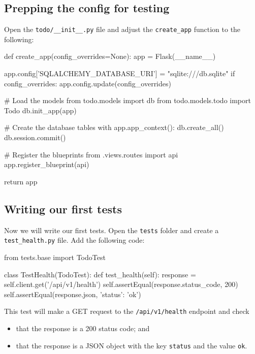 \documentclass{csse4400}
\begin{document}
\subsection{Prepping the config for testing}

Open the \texttt{todo/\_\_init\_\_.py} file and adjust the \texttt{create\_app} function to the following:

\begin{code}[language=python,numbers=none]{}
  def create_app(config_overrides=None):
      app = Flask(__name__)
  
      app.config['SQLALCHEMY_DATABASE_URI'] = "sqlite:///db.sqlite"
      if config_overrides:
          app.config.update(config_overrides)
          
      # Load the models
      from todo.models import db
      from todo.models.todo import Todo
      db.init_app(app)
  
      # Create the database tables
      with app.app_context():
          db.create_all()
          db.session.commit()
  
      # Register the blueprints
      from .views.routes import api
      app.register_blueprint(api)
  
      return app
\end{code}

\subsection{Writing our first tests}

Now we will write our first tests.
Open the \texttt{tests} folder and create a \texttt{test\_health.py} file.
Add the following code:

\begin{code}[language=python,numbers=none]{}
  from tests.base import TodoTest
  
  
  class TestHealth(TodoTest):
      def test_health(self):
          response = self.client.get('/api/v1/health')
          self.assertEqual(response.status_code, 200)
          self.assertEqual(response.json, {'status': 'ok'})

\end{code}

This test will make a GET request to the \texttt{/api/v1/health} endpoint and check 
\begin{itemize}
  \item that the response is a 200 status code; and
  \item that the response is a JSON object with the key \texttt{status} and the value \texttt{ok}.
\end{itemize}
\end{document}
